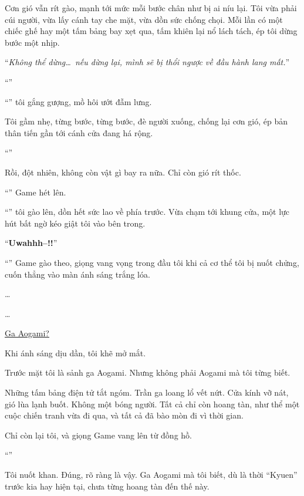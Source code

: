 \documentclass[../main.tex]{subfiles}
\begin{document}
Cơn gió vẫn rít gào, mạnh tới mức mỗi bước chân như bị ai níu lại. Tôi vừa phải cúi người, vừa lấy cánh tay che mặt, vừa dồn sức chống chọi. Mỗi lần có một chiếc ghế hay một tấm bảng bay xẹt qua, tấm khiên lại nổ lách tách, ép tôi dừng bước một nhịp.

``\textit{Không thể dừng\dots\ nếu dừng lại, mình sẽ bị thổi ngược về đầu hành lang mất.}''

``''

``'' tôi gắng gượng, mồ hôi ướt đẫm lưng.

Tôi gầm nhẹ, từng bước, từng bước, đè người xuống, chống lại cơn gió, ép bản thân tiến gần tới cánh cửa đang há rộng.

``''

Rồi, đột nhiên, không còn vật gì bay ra nữa. Chỉ còn gió rít thốc.

``\textbf{}'' Game hét lên.

``'' tôi gào lên, dồn hết sức lao về phía trước. Vừa chạm tới khung cửa, một lực hút bất ngờ kéo giật tôi vào bên trong.

``\textbf{Uwahhh--!!}''

``'' Game gào theo, giọng vang vọng trong đầu tôi khi cả cơ thể tôi bị nuốt chửng, cuốn thẳng vào màn ánh sáng trắng lóa.

\dots

\dots

\begin{center}
    \uline{Ga Aogami?}
\end{center}

Khi ánh sáng dịu dần, tôi khẽ mở mắt.

Trước mặt tôi là sảnh ga Aogami. Nhưng không phải Aogami mà tôi từng biết.

Những tấm bảng điện tử tắt ngóm. Trần ga loang lổ vết nứt. Cửa kính vỡ nát, gió lùa lạnh buốt. Không một bóng người. Tất cả chỉ còn hoang tàn, như thể một cuộc chiến tranh vừa đi qua, và tất cả đã bào mòn đi vì thời gian.

Chỉ còn lại tôi, và giọng Game vang lên từ đồng hồ.

``''

Tôi nuốt khan. Đúng, rõ ràng là vậy. Ga Aogami mà tôi biết, dù là thời ``Kyuen'' trước kia hay hiện tại, chưa từng hoang tàn đến thế này.
\end{document}
